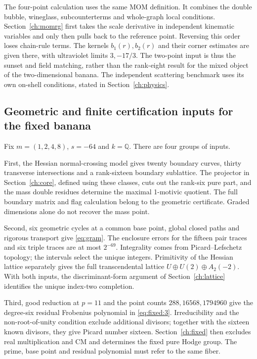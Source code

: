 \documentclass[11pt,a4paper,oneside]{article}
\theoremstyle{plain}
\theoremstyle{definition}
\theoremstyle{remark}
\numberwithin{equation}{section}
\begin{document}
The four-point calculation uses the same MOM definition. It combines the double bubble, wineglass, subcounterterms and whole-graph local conditions. Section~\ref{ch:momrg} first takes the scale derivative in independent kinematic variables and only then pulls back to the reference point. Reversing this order loses chain-rule terms. The kernels $b_1(r),b_2(r)$ and their corner estimates are given there, with ultraviolet limits $3,-17/3$. The two-point input is thus the sunset and field matching, rather than the rank-eight result for the mixed object of the two-dimensional banana. The independent scattering benchmark uses its own on-shell conditions, stated in Section~\ref{ch:physics}.

\subsection{Geometric and finite certification inputs for the fixed banana}
Fix $m=(1,2,4,8)$, $s=-64$ and $k=\mathbb Q$. There are four groups of inputs.

First, the Hessian normal-crossing model gives twenty boundary curves, thirty transverse intersections and a rank-sixteen boundary sublattice. The projector in Section~\ref{ch:core}, defined using these classes, cuts out the rank-six pure part, and the mass double residues determine the maximal 1-motivic quotient. The full boundary matrix and flag calculation belong to the geometric certificate. Graded dimensions alone do not recover the mass point.

Second, six geometric cycles at a common base point, global closed paths and rigorous transport give \eqref{eq:gram}. The enclosure errors for the fifteen pair traces and six triple traces are at most $2^{-69}$. Integrality comes from Picard--Lefschetz topology; the intervals select the unique integers. Primitivity of the Hessian lattice separately gives the full transcendental lattice $U\oplus U(2)\oplus A_2(-2)$. With both inputs, the discriminant-form argument of Section~\ref{ch:lattice} identifies the unique index-two completion.

Third, good reduction at $p=11$ and the point counts $288,16568,1794960$ give the degree-six residual Frobenius polynomial in \eqref{eq:fixed:3}. Irreducibility and the non-root-of-unity condition exclude additional divisors; together with the sixteen known divisors, they give Picard number sixteen. Section~\ref{ch:fixed} then excludes real multiplication and CM and determines the fixed pure Hodge group. The prime, base point and residual polynomial must refer to the same fiber.
\end{document}
